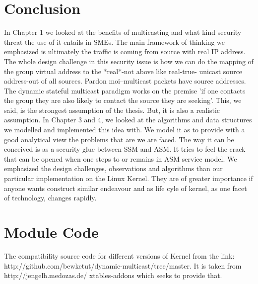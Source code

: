 \chapter{Conclusion}
In Chapter 1 we looked at the benefits of multicasting and what kind security
threat the use of it entails in SMEs. The main framework of thinking we emphasized
is ultimately the traffic is coming from source with real IP address. The whole
design challenge in this security issue is how we can do the mapping of the group
virtual address to the *real*-not above like real-true- unicast source address-out of all sources. Pardon moi--multicast packets have source addresses. The dynamic stateful multicast
paradigm works on the premise 'if one contacts the group they are also likely to
contact the source they are seeking'. This, we said, is the strongest assumption of
the thesis.  But, it is also a realistic assumption.
In Chapter 3 and 4, we looked at the algorithms and data structures we modelled
and implemented this idea with. We model it as to provide with a good analytical
view the problems that are we are faced. The way it can be conceived is as a
security glue between SSM and ASM. It tries to feel the crack that can be opened
when one steps to or remains in ASM service model.
We emphasized the design challenges, observations and algorithms than our
particular implementation on the Linux Kernel. They are of greater importance if
anyone wants construct similar endeavour and as life cyle of kernel, as one facet of
technology, changes rapidly.
\appendix
\chapter{Module Code}
The compatibility source code for different versions of Kernel from the link:
http://github.com/bewketut/dynamic-multicast/tree/master. It is taken from http://jengelh.medozas.de/ xtables-addons which seeks to provide that.
